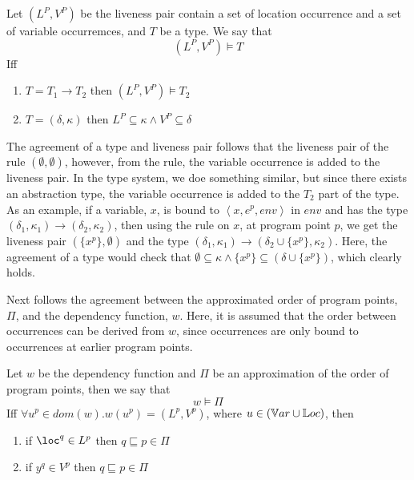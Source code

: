 \documentclass[../../master.tex]{subfiles}
\begin{document}
\begin{definition}
	Let $(L^P,V^P)$ be the liveness pair contain a set of location occurrence and a set of variable occurremces, and $T$ be a type.
	We say that
	$$(L^P,V^P)\models T$$
	Iff
	\begin{enumerate}
		\item $T=T_1\rightarrow T_2$ then $(L^P,V^P)\models T_2$
		\item $T=(\delta,\kappa)$ then $L^P\subseteq\kappa\wedge V^P\subseteq\delta$
	\end{enumerate}
\end{definition}
The agreement of a type and liveness pair follows that the liveness pair of the  rule $(\emptyset,\emptyset)$, however, from the  rule, the variable occurrence is added to the liveness pair.
In the type system, we doe something similar, but since there exists an abstraction type, the variable occurrence is added to the $T_2$ part of the type.
As an example, if a variable, $x$, is bound to $\left\langle x,e^p,env\right\rangle$ in $env$ and has the type $(\delta_1,\kappa_1)\rightarrow(\delta_2,\kappa_2)$, then using the  rule on $x$, at program point $p$, we get the liveness pair $(\{x^p\},\emptyset)$ and the type $(\delta_1,\kappa_1)\rightarrow(\delta_2\cup\{x^p\},\kappa_2)$.
Here, the agreement of a type would check that $\emptyset\subseteq\kappa\wedge\{x^p\}\subseteq(\delta\cup\{x^p\})$, which clearly holds.

Next follows the agreement between the approximated order of program points, $\Pi$, and the dependency function, $w$.
Here, it is assumed that the order between occurrences can be derived from $w$, since occurrences are only bound to occurrences at earlier program points.

\begin{definition}
	Let $w$ be the dependency function and $\Pi$ be an approximation of the order of program points, then we say that
	$$w\models\Pi$$
	Iff $\forall u^p\in dom(w).w(u^p)=(L^p,V^p)$, where $u\in(\mathbb{V}ar\cup\mathbb{L}oc)$, then
	\begin{enumerate}
		\item if $\loc^q\in L^p$ then $q\sqsubseteq p\in\Pi$
		\item if $y^q\in V^p$ then $q\sqsubseteq p\in\Pi$
	\end{enumerate}
\end{definition}
\end{document}
